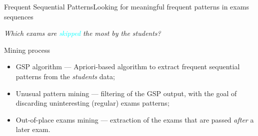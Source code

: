 \begin{frame}{Frequent Sequential Patterns}{Looking for meaningful frequent patterns in exams sequences}

    \centering\textit{Which exams are \textcolor{cyan}{skipped} the most by the students?} \vspace{0,3cm}

\begin{block}{Mining process}
		\begin{itemize}
			\item<1-> \alert{GSP algorithm} --- Apriori-based algorithm to extract frequent sequential patterns from the \emph{students} data; \vspace{0.2cm}
			\item<2-> \alert{Unusual pattern mining} --- filtering of the GSP output, with the goal of discarding uninteresting (regular) exams patterns; \vspace{0.2cm}
			\item<3-> \alert{Out-of-place exams mining} --- extraction of the exams that are passed \emph{after} a later exam.
		\end{itemize}
	\end{block}

\end{frame}

